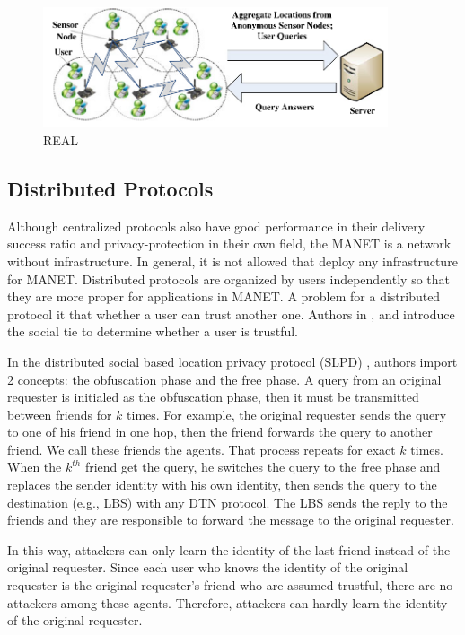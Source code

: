 \begin{figure} [H]
  \centering 
  \includegraphics[width=4.0in]{figures/FIG_REAL_26.png}
  \caption{REAL \cite{C25}} 
  \label{fig:REAL} %
\end{figure}

\subsection{ Distributed Protocols}

\noindent Although centralized protocols also have good performance in their delivery success ratio and privacy-protection in their own field, the MANET is a network without infrastructure. In general, it is not allowed that deploy any infrastructure for MANET. Distributed protocols are organized by users independently so that they are more proper for applications in MANET. A problem for a distributed protocol it that whether a user can trust another one. Authors in \cite {C16}, \cite {C17} and \cite {C18} introduce the social tie to determine whether a user is trustful.

In the distributed social based location privacy protocol (SLPD) \cite {C16}, authors import 2 concepts: the obfuscation phase and the free phase. A query from an original requester is initialed as the obfuscation phase, then it must be transmitted between friends for $k$ times. For example, the original requester sends the query to one of his friend in one hop, then the friend forwards the query to another friend. We call these friends the agents. That process repeats for exact $k$ times. When the $k^{th}$ friend get the query, he switches the query to the free phase and replaces the sender identity with his own identity, then sends the query to the destination (e.g., LBS) with any DTN protocol. The LBS sends the reply to the friends and they are responsible to forward the message to the original requester. 

In this way, attackers can only learn the identity of the last friend instead of the original requester. Since each user who knows the identity of the original requester is the original requester's friend who are assumed trustful, there are no attackers among these agents. Therefore, attackers can hardly learn the identity of the original requester.


